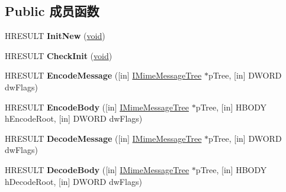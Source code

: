 \subsection*{Public 成员函数}
\begin{DoxyCompactItemize}
\item 
\mbox{\label{interface_m_i_m_e_o_l_e_1_1_i_mime_security_aceadd2e52ce15e80b66122b62117eb37}} 
H\+R\+E\+S\+U\+LT {\bfseries Init\+New} (\hyperlink{interfacevoid}{void})
\item 
\mbox{\label{interface_m_i_m_e_o_l_e_1_1_i_mime_security_a417ff560c87986d642f9fbceac79ae66}} 
H\+R\+E\+S\+U\+LT {\bfseries Check\+Init} (\hyperlink{interfacevoid}{void})
\item 
\mbox{\label{interface_m_i_m_e_o_l_e_1_1_i_mime_security_af1fdf2d4e16b0fc963f82b82059b02e9}} 
H\+R\+E\+S\+U\+LT {\bfseries Encode\+Message} (\mbox{[}in\mbox{]} \hyperlink{interface_m_i_m_e_o_l_e_1_1_i_mime_message_tree}{I\+Mime\+Message\+Tree} $\ast$p\+Tree, \mbox{[}in\mbox{]} D\+W\+O\+RD dw\+Flags)
\item 
\mbox{\label{interface_m_i_m_e_o_l_e_1_1_i_mime_security_a5c19d9610a9d916344e1eede3078be10}} 
H\+R\+E\+S\+U\+LT {\bfseries Encode\+Body} (\mbox{[}in\mbox{]} \hyperlink{interface_m_i_m_e_o_l_e_1_1_i_mime_message_tree}{I\+Mime\+Message\+Tree} $\ast$p\+Tree, \mbox{[}in\mbox{]} H\+B\+O\+DY h\+Encode\+Root, \mbox{[}in\mbox{]} D\+W\+O\+RD dw\+Flags)
\item 
\mbox{\label{interface_m_i_m_e_o_l_e_1_1_i_mime_security_a97a40e6a3894ba4a7feda00d08760158}} 
H\+R\+E\+S\+U\+LT {\bfseries Decode\+Message} (\mbox{[}in\mbox{]} \hyperlink{interface_m_i_m_e_o_l_e_1_1_i_mime_message_tree}{I\+Mime\+Message\+Tree} $\ast$p\+Tree, \mbox{[}in\mbox{]} D\+W\+O\+RD dw\+Flags)
\item 
\mbox{\label{interface_m_i_m_e_o_l_e_1_1_i_mime_security_a0113c0d1f65c925b15b10d41b2e4e07c}} 
H\+R\+E\+S\+U\+LT {\bfseries Decode\+Body} (\mbox{[}in\mbox{]} \hyperlink{interface_m_i_m_e_o_l_e_1_1_i_mime_message_tree}{I\+Mime\+Message\+Tree} $\ast$p\+Tree, \mbox{[}in\mbox{]} H\+B\+O\+DY h\+Decode\+Root, \mbox{[}in\mbox{]} D\+W\+O\+RD dw\+Flags)

\end{DoxyCompactItemize}
